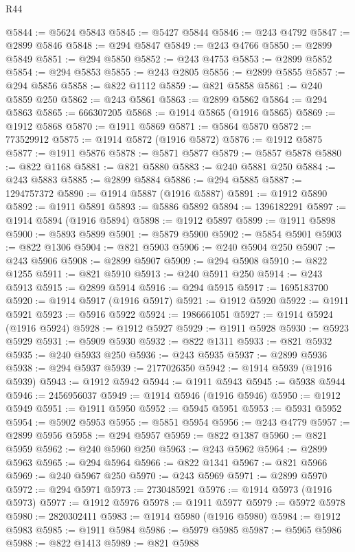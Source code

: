 \begin{lexlean}{R44}
\begin{coremodule}
{@5844 := @5624 @5843
@5845 := @5427 @5844
@5846 := @243 @4792
@5847 := @2899 @5846
@5848 := @294 @5847
@5849 := @243 @4766
@5850 := @2899 @5849
@5851 := @294 @5850
@5852 := @243 @4753
@5853 := @2899 @5852
@5854 := @294 @5853
@5855 := @243 @2805
@5856 := @2899 @5855
@5857 := @294 @5856
@5858 := @822 @1112
@5859 := @821 @5858
@5861 := @240 @5859 @250
@5862 := @243 @5861
@5863 := @2899 @5862
@5864 := @294 @5863
@5865 := 666307205
@5868 := @1914 @5865 (@1916 @5865)
@5869 := @1912 @5868
@5870 := @1911 @5869
@5871 := @5864 @5870
@5872 := 773529912
@5875 := @1914 @5872 (@1916 @5872)
@5876 := @1912 @5875
@5877 := @1911 @5876
@5878 := @5871 @5877
@5879 := @5857 @5878
@5880 := @822 @1168
@5881 := @821 @5880
@5883 := @240 @5881 @250
@5884 := @243 @5883
@5885 := @2899 @5884
@5886 := @294 @5885
@5887 := 1294757372
@5890 := @1914 @5887 (@1916 @5887)
@5891 := @1912 @5890
@5892 := @1911 @5891
@5893 := @5886 @5892
@5894 := 1396182291
@5897 := @1914 @5894 (@1916 @5894)
@5898 := @1912 @5897
@5899 := @1911 @5898
@5900 := @5893 @5899
@5901 := @5879 @5900
@5902 := @5854 @5901
@5903 := @822 @1306
@5904 := @821 @5903
@5906 := @240 @5904 @250
@5907 := @243 @5906
@5908 := @2899 @5907
@5909 := @294 @5908
@5910 := @822 @1255
@5911 := @821 @5910
@5913 := @240 @5911 @250
@5914 := @243 @5913
@5915 := @2899 @5914
@5916 := @294 @5915
@5917 := 1695183700
@5920 := @1914 @5917 (@1916 @5917)
@5921 := @1912 @5920
@5922 := @1911 @5921
@5923 := @5916 @5922
@5924 := 1986661051
@5927 := @1914 @5924 (@1916 @5924)
@5928 := @1912 @5927
@5929 := @1911 @5928
@5930 := @5923 @5929
@5931 := @5909 @5930
@5932 := @822 @1311
@5933 := @821 @5932
@5935 := @240 @5933 @250
@5936 := @243 @5935
@5937 := @2899 @5936
@5938 := @294 @5937
@5939 := 2177026350
@5942 := @1914 @5939 (@1916 @5939)
@5943 := @1912 @5942
@5944 := @1911 @5943
@5945 := @5938 @5944
@5946 := 2456956037
@5949 := @1914 @5946 (@1916 @5946)
@5950 := @1912 @5949
@5951 := @1911 @5950
@5952 := @5945 @5951
@5953 := @5931 @5952
@5954 := @5902 @5953
@5955 := @5851 @5954
@5956 := @243 @4779
@5957 := @2899 @5956
@5958 := @294 @5957
@5959 := @822 @1387
@5960 := @821 @5959
@5962 := @240 @5960 @250
@5963 := @243 @5962
@5964 := @2899 @5963
@5965 := @294 @5964
@5966 := @822 @1341
@5967 := @821 @5966
@5969 := @240 @5967 @250
@5970 := @243 @5969
@5971 := @2899 @5970
@5972 := @294 @5971
@5973 := 2730485921
@5976 := @1914 @5973 (@1916 @5973)
@5977 := @1912 @5976
@5978 := @1911 @5977
@5979 := @5972 @5978
@5980 := 2820302411
@5983 := @1914 @5980 (@1916 @5980)
@5984 := @1912 @5983
@5985 := @1911 @5984
@5986 := @5979 @5985
@5987 := @5965 @5986
@5988 := @822 @1413
@5989 := @821 @5988
}
\end{coremodule}
\end{lexlean}
